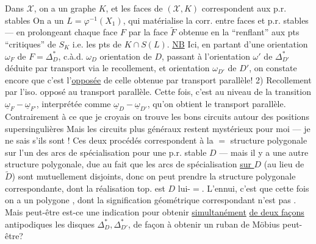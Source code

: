 Dans $\mathcal X$, on a un graphe  $K$, et les faces de $(\mathcal X,K)$ correspondent aux p.r. stables \unsure{\&}  On a un $L=\varphi^{-1}(X_1)$, qui matérialise la corr. entre faces et p.r. stables --- en prolongeant chaque face $F$ par la face $\widetilde F$ obtenue en la ``renflant'' aux pts  ``critiques'' de $S_K$ i.e. les pts de $K\cap S(L)$.
\uline{NB} Ici, en partant d'une orientation $\omega_F$ de $F=\Delta_D^*$, c.à.d. $\omega_D$ orientation de $D$, passant à l'orientation $\omega'$ de $\Delta_{D'}^*$ déduite par transport via le recollement, et  orientation $\omega_{D'}$ de $D'$, on constate encore que c'est l'\uline{opposée} de celle obtenue par transport parallèle!
2) Recollement par l'iso.  opposé au transport parallèle. Cette fois, c'est au niveau de la transition $\underline\omega_F\mathbin{-}\underline\omega_{F'}$, interprétée comme $\underline\omega_D\mathbin{-}\underline\omega_{D'}$, qu'on obtient le transport parallèle. Contrairement à ce que je croyais  on trouve les bons circuits autour des positions supersingulières
Mais les circuits plus généraux restent mystérieux pour moi --- je ne sais s'ils sont !
Ces deux procédés correspondent à la $=$ structure polygonale sur l'un des arcs de spécialisation  pour une p.r. stable $D$ --- mais il y a une autre structure polygonale, due au fait que les  arcs de spécialisation \uline{sur $D$} (au lieu de $\widetilde D$) sont mutuellement disjoints, donc on peut prendre la structure polygonale correspondante, dont la réalisation top. est  $D$ lui-$=$. L'ennui, c'est que cette fois on a un polygone   , dont la signification géométrique  correspondant n'est pas . Mais peut-être est-ce une indication pour obtenir \uline{simultanément} \uline{de deux façons} antipodiques les disques $\Delta_D^*,\Delta_{D'}^*$, de façon à obtenir un ruban de Möbius peut-être?
